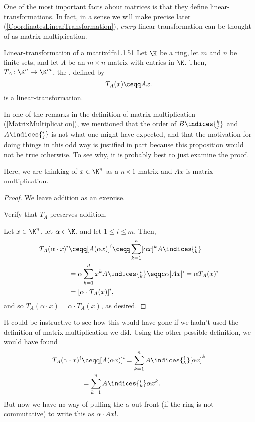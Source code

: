 One of the most important facts about matrices is that they define linear-transformations.  In fact, in a sense we will make precise later (\cref{CoordinatesLinearTransformation}), \emph{every} linear-transformation can be thought of as matrix multiplication.
\begin{prp}{Linear-transformation of a matrix}{dfn1.1.51}
	Let $\K$ be a ring, let $m$ and $n$ be finite sets, and let $A$ be an $m\times n$ matrix with entries in $\K$.  Then, $T_A\colon \K ^n\rightarrow \K ^m$, the , defined by
	\begin{equation}
	T_A(x)\ceqq Ax.
	\end{equation}
	is a linear-transformation.
	\begin{rmk}
		In one of the remarks in the definition of matrix multiplication (\cref{MatrixMultiplication}), we mentioned that the order of $B\indices{^k_j}$ and $A\indices{^i_j}$ is not what one might have expected, and that the motivation for doing things in this odd way is justified in part because this proposition would not be true otherwise.  To see why, it is probably best to just examine the proof.
	\end{rmk}
	\begin{rmk}
		Here, we are thinking of $x\in \K ^n$ as a $n\times 1$ matrix and $Ax$ is matrix multiplication.
	\end{rmk}
	\begin{proof}
		We leave addition as an exercise.
		\begin{exr}[breakable=false]{}{}
			Verify that $T_A$ preserves addition.
		\end{exr}
		
		Let $x\in \K ^n$, let $\alpha \in \K$, and let $1\leq i\leq m$.  Then,
		\begin{equation}
			\begin{split}
				T_A(\alpha \cdot x)^i & \ceqq [A(\alpha x)]^i\ceqq \sum _{k=1}^n[\alpha x]^kA\indices{^i_k} \\
				& =\alpha \sum _{k=1}^dx^kA\indices{^i_k}\eqqc \alpha [Ax]^i=\alpha T_A(x)^i \\
				& =[\alpha \cdot T_A(x)]^i,
			\end{split}
		\end{equation}
		and so $T_A(\alpha \cdot x)=\alpha \cdot T_A(x)$, as desired.
	\end{proof}
	\begin{rmk}
		It could be instructive to see how this would have gone if we hadn't used the definition of matrix multiplication we did.  Using the other possible definition, we would have found
		\begin{equation}
			\begin{split}
				T_A(\alpha \cdot x)^i & \ceqq [A(\alpha x)]^i=\sum _{k=1}^nA\indices{^i_k}[\alpha x]^k \\
				& =\sum _{k=1}^nA\indices{^i_k}\alpha x^k.
			\end{split}
		\end{equation}
		But now we have no way of pulling the $\alpha$ out front (if the ring is not commutative) to write this as $\alpha \cdot Ax$!.
	\end{rmk}
\end{prp}
